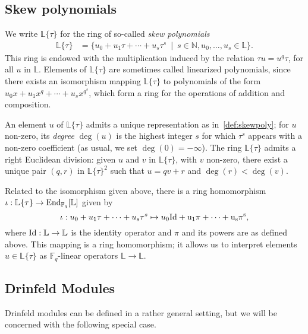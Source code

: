 \documentclass[sigconf]{acmart}
\newcommand{\F}{\mathbb{F}}
\newcommand{\N}{\mathbb{N}}
\renewcommand{\L}{\mathbb{L}}
\newcommand{\ang}[1]{\{#1\}}
\begin{document}

\subsection{Skew polynomials}

We write $\L\ang{\tau}$ for the ring of so-called {\em skew
  polynomials}
\begin{align}\label{def:skewpoly}
\L\ang{\tau} &= \{u_0 + u_1 \tau + \cdots + u_s \tau^s \ \mid \ s \in
\N, u_0,\dots,u_s \in \L\}.
\end{align}
This ring is endowed with the multiplication induced by the relation
$\tau u = u^q \tau$, for all $u$ in $\L$.  Elements of $\L\ang{\tau}$
are sometimes called linearized polynomials, since there exists an
isomorphism mapping $\L\ang{\tau}$ to polynomials of the form $u_0x +
u_1 x^q + \cdots + u_s x^{q^s}$, which form a ring for the operations
of addition and composition. 

An element $u$ of $\L\ang{\tau}$ admits a unique representation as
in~\eqref{def:skewpoly}; for $u$ non-zero, its {\em degree} $\deg(u)$
is the highest integer $s$ for which $\tau^s$ appears with a non-zero
coefficient (as usual, we set $\deg(0) =-\infty$).  The ring
$\L\ang{\tau}$ admits a right Euclidean division: given $u$ and $v$ in
$\L\ang{\tau}$, with $v$ non-zero, there exist a unique pair $(q,r)$
in $\L\ang{\tau}^2$ such that $u = qv +r$ and $\deg(r) < \deg(v)$.

Related to the isomorphism given above, there is a ring homomorphism
$\iota:\L\ang{\tau} \to {\rm End}_{\F_q}[\L]$ given by
\[\iota: u_0 + u_1\tau + \dots
+ u_s\tau^s \mapsto u_0 \rm{Id} + u_1 \pi + \dots+ u_s \pi^s, \] where
$\rm{Id}: \L \to \L$ is the identity operator and $\pi$ and its powers
are as defined above. This mapping is a ring homomorphism; it allows
us to interpret elements $u \in \L\ang{\tau}$ as $\F_q$-linear
operators $\L \to \L$.


\subsection{Drinfeld Modules}

Drinfeld modules can be defined in a rather general setting, but we
will be concerned with the following special case.
\end{document}
